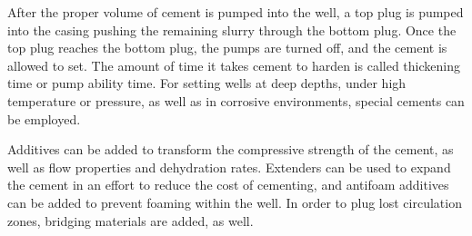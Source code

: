 After the proper volume of cement is pumped into the well, a top plug is pumped into 
the casing pushing the remaining slurry through the bottom plug.
Once the top plug reaches the bottom plug, the pumps are turned off, and the cement is allowed to set.
The amount of time it takes cement to harden is called thickening time or pump ability time. 
For setting wells at deep depths, under high temperature or pressure, as well as in corrosive environments,
special cements can be employed.

\vspace{1em}

Additives can be added to transform the compressive strength of the cement,
as well as flow properties and dehydration rates. Extenders can be used to 
expand the cement in an effort to reduce the cost of cementing, and antifoam additives
can be added to prevent foaming within the well. In order to plug lost circulation zones, 
bridging materials are added, as well.


    